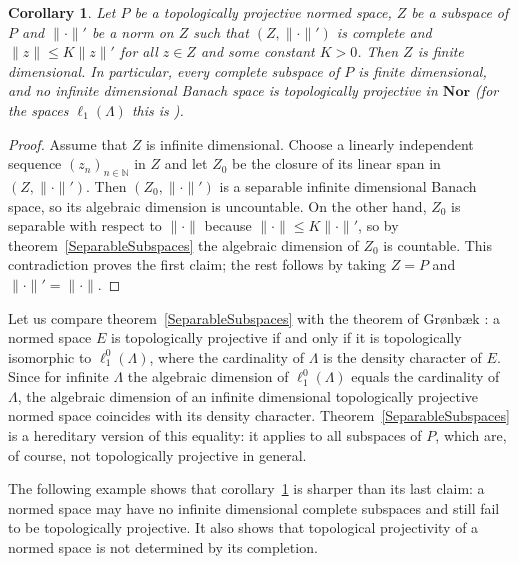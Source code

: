 \documentclass[12pt]{article}
\newtheorem{corollary}[theorem]{Corollary}
\newcommand{\Nor}{\mathbf{Nor}}
\newcommand{\lo}[1]{\ell_1^0(#1)}
\newcommand{\ellone}[1]{\ell_1(#1)}
\newcommand{\norm}[1]{\lVert #1\rVert}
\begin{document}
\begin{corollary}\label{NoCompleteSubspaces} Let $P$ be a topologically
    projective normed space, $Z$ be a subspace of $P$ and $\norm{\cdot}'$ be a
    norm on $Z$ such that $(Z,\norm{\cdot}')$ is complete and
    $\norm{z}\leq K\norm{z}'$ for all $z\in Z$ and some constant $K>0$. Then
    $Z$ is finite dimensional. In particular, every complete subspace of $P$
    is finite dimensional, and no infinite dimensional Banach space is
    topologically projective in $\Nor$ (for the spaces $\ellone{\Lambda}$ this
    is \cite[proposition 2.5]{HelExtrProjSeqAlg}).
\end{corollary}
\begin{proof} Assume that $Z$ is infinite dimensional. Choose a linearly
    independent sequence ${(z_n)}_{n\in\mathbb{N}}$ in $Z$ and let $Z_0$ be
    the closure of its linear span in $(Z,\norm{\cdot}')$. Then
    $(Z_0,\norm{\cdot}')$ is a separable infinite dimensional Banach space, so
    its algebraic dimension is uncountable. On the other hand, $Z_0$ is
    separable with respect to $\norm{\cdot}$ because $\norm{\cdot}\leq
    K\norm{\cdot}'$, so by theorem~\ref{SeparableSubspaces} the algebraic
    dimension of $Z_0$ is countable. This contradiction proves the first
    claim; the rest follows by taking $Z=P$ and $\norm{\cdot}'=\norm{\cdot}$.
\end{proof}

Let us compare theorem~\ref{SeparableSubspaces} with the theorem of
Gr{\o}nb{\ae}k \cite[theorem 2.1]{GronLiftProbNormSp}: a normed space $E$ is
topologically projective if and only if it is topologically isomorphic to
$\lo{\Lambda}$, where the cardinality of $\Lambda$ is the density character
of $E$. Since for infinite $\Lambda$ the algebraic dimension of $\lo{\Lambda}$
equals the cardinality of $\Lambda$, the algebraic dimension of an infinite
dimensional topologically projective normed space coincides with its density
character. Theorem~\ref{SeparableSubspaces} is a hereditary version of this
equality: it applies to all subspaces of $P$, which are, of course, not
topologically projective in general.

The following example shows that corollary~\ref{NoCompleteSubspaces} is
sharper than its last claim: a normed space may have no infinite dimensional
complete subspaces and still fail to be topologically projective. It also
shows that topological projectivity of a normed space is not determined by its
completion.
\end{document}
